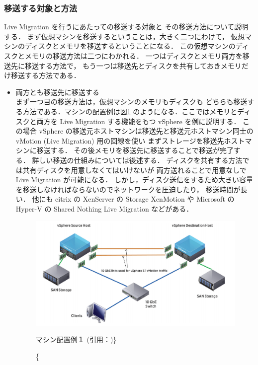 \documentclass[graduation-thesis]{mlarticle}
\begin{document}
\subsubsection{移送する対象と方法}
\label{sec-2-3-3}
Live Migration を行うにあたっての移送する対象と
その移送方法について説明する．
まず仮想マシンを移送するということは，大きく二つにわけて，
仮想マシンのディスクとメモリを移送するということになる．
この仮想マシンのディスクとメモリの移送方法は二つにわかれる．
一つはディスクとメモリ両方を移送先に移送する方法で，
もう一つは移送先とディスクを共有しておきメモリだけ移送する方法である．
\begin{itemize}
\item 両方とも移送先に移送する\\
      まず一つ目の移送方法は，仮想マシンのメモリもディスクも
どちらも移送する方法である．マシンの配置例は図\ref{arrangement1}
のようになる．ここではメモリとディスクと両方を Live Migration する機能をもつ
vSphere を例に説明する．
この場合 vSphere の移送元ホストマシンは移送先と移送元ホストマシン同士の
vMotion (Live Migration) 用の回線を使い
まずストレージを移送先ホストマシンに移送する．
その後メモリを移送先に移送することで移送が完了する．
詳しい移送の仕組みについては後述する．
ディスクを共有する方法では共有ディスクを用意しなくてはいけないが
両方送れることで用意なしで Live Migration が可能になる．
しかし，ディスク送信をするため大きい容量を移送しなければならないのでネットワークを圧迫したり，
移送時間が長い．
他にも citrix の XenServer の Storage XenMotion や 
Microsoft の Hyper-V の Shared Nothing Live Migration などがある．
\cite{xenserver_migration}
\begin{figure}[H]\begin{center}\includegraphics[width=16.0cm]{./img/arrangement1.png}\caption\{ マシン配置例１ (引用：\cite{vmotion})\}\label{arrangement1}\end{center}\end{figure}

\end{itemize}
\end{document}
